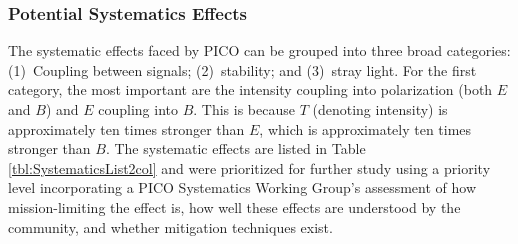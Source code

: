 \documentclass[PICOReport.tex]{subfiles}
\begin{document}





\subsubsection{Potential Systematics Effects}
\label{sec:systematics_list}


The systematic effects faced by PICO can be grouped into three broad categories: (1)~Coupling between signals; (2)~stability; and (3)~stray light. For the first category, the most important are the intensity coupling into polarization (both $E$ and $B$) and $E$ coupling into $B$. This is because $T$ (denoting intensity) is approximately ten times stronger than $E$, which is approximately ten times stronger than $B$. The systematic effects are listed in Table \ref{tbl:SystematicsList2col} and were prioritized for further study using a priority level incorporating a PICO Systematics Working Group's assessment of how mission-limiting the effect is, how well these effects are understood by the community, and whether mitigation techniques exist.  
\end{document}
